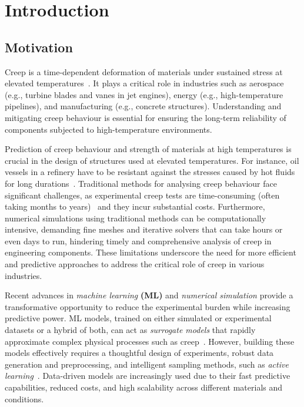 \documentclass[class=scrbook, crop=false]{standalone}
\begin{document}
\chapter{Introduction}
\label{Chapter::Introduction}

\section{Motivation}
\label{Section::Motivation}

Creep is a time-dependent deformation of materials under sustained stress at elevated temperatures~\cite{dieter1986mechanical}. It plays a critical role in industries such as aerospace (e.g., turbine blades and vanes in jet engines), energy (e.g., high-temperature pipelines), and manufacturing (e.g., concrete structures). Understanding and mitigating creep behaviour is essential for ensuring the long-term reliability of components subjected to high-temperature environments. 

Prediction of creep behaviour and strength of materials at high temperatures is crucial in the design of structures used at elevated temperatures. For instance, oil vessels in a refinery have to be resistant against the stresses caused by hot fluids for long durations~\cite{kassner2000erratum}. Traditional methods for analysing creep behaviour face significant challenges, as experimental creep tests are time-consuming (often taking months to years)~\cite{evans1985creep} and they incur substantial costs. Furthermore, numerical simulations using traditional methods can be computationally intensive, demanding fine meshes and iterative solvers that can take hours or even days to run, hindering timely and comprehensive analysis of creep in engineering components. These limitations underscore the need for more efficient and predictive approaches to address the critical role of creep in various industries.

Recent advances in \textit{machine learning} \textbf{(ML)} and \textit{numerical simulation} provide a transformative opportunity to reduce the experimental burden while increasing predictive power. ML models, trained on either simulated or experimental datasets or a hybrid of both, can act as \textit{surrogate models} that rapidly approximate complex physical processes such as creep~\cite{bessa2017framework}. However, building these models effectively requires a thoughtful design of experiments, robust data generation and preprocessing, and intelligent sampling methods, such as \textit{active learning}~\cite{lookman2019active}. Data-driven models are increasingly used due to their fast predictive capabilities, reduced costs, and high scalability across different materials and conditions.
\end{document}
